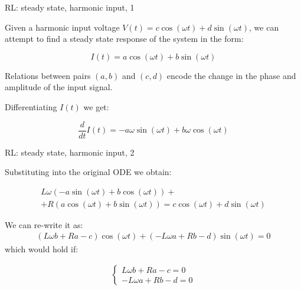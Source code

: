 \documentclass{beamer}
\begin{document}
\begin{frame}{RL: steady state, harmonic input, 1}
	\begin{flushleft}
		
		Given a harmonic input voltage $V(t) = c \cos (\omega t) + d \sin (\omega t)$, we can attempt to find a steady state response of the system in the form:
		
		\begin{equation}
			I(t) = a \cos (\omega t) + b \sin (\omega t)
		\end{equation}
		
		Relations between pairs $(a, b)$ and $(c, d)$ encode the change in the phase and amplitude of the input signal.
		
		\bigskip
		
		Differentiating $I(t)$ we get:
		
		\begin{equation}
			\frac{d}{dt}I(t) = -a\omega \sin (\omega t) + b\omega \cos (\omega t)
		\end{equation}
		
	\end{flushleft}
\end{frame}




\begin{frame}{RL: steady state, harmonic input, 2}
	\begin{flushleft}
		
		Substituting into the original ODE we obtain:
		
		\begin{align*}
			L\omega (-a \sin (\omega t) + b \cos (\omega t)) + \\
			+ R (a \cos (\omega t) + b \sin (\omega t))
			=
			c \cos (\omega t) + d \sin (\omega t)
		\end{align*}
	
		We can re-write it as:
		\begin{align*}
			(L\omega b  + Ra  - c) \cos (\omega t)
			+
			(-L\omega a + Rb - d) \sin (\omega t) = 0
		\end{align*}
		 which would hold if:
		 
		 \begin{align}
		 	\begin{cases}
		 		 L\omega b + Ra - c = 0 \\
		 		-L\omega a + Rb - d = 0
		 	\end{cases}
		 \end{align}
		 
		
	\end{flushleft}
\end{frame}
\end{document}
